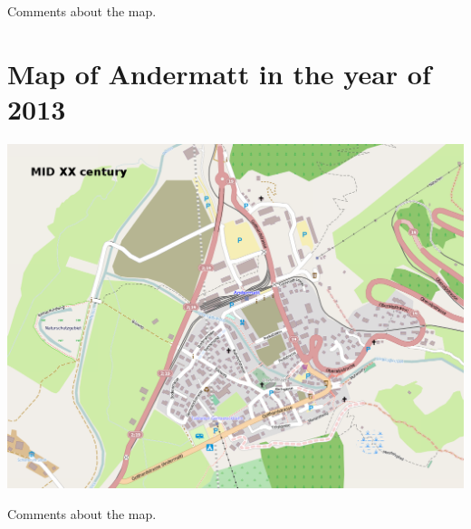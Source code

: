 \documentclass[a4paper]{article}
\newcommand{\mycity}{Andermatt\xspace}
\begin{document}
Comments about the map.

\newpage

\section{Map of \mycity in the year of 2013}
\includegraphics[keepaspectratio,width=\textwidth]{map2}

Comments about the map.

\newpage

\end{document}
